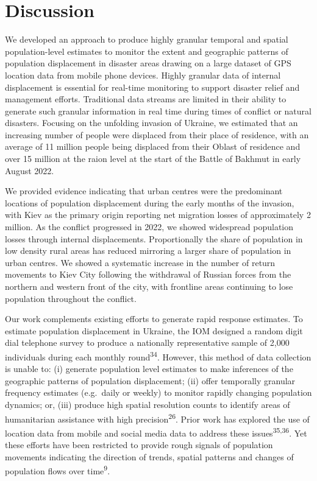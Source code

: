 \documentclass[
  11pt,
]{article}
\begin{document}
\section{Discussion}\label{discussion}

We developed an approach to produce highly granular temporal and spatial
population-level estimates to monitor the extent and geographic patterns
of population displacement in disaster areas drawing on a large dataset
of GPS location data from mobile phone devices. Highly granular data of
internal displacement is essential for real-time monitoring to support
disaster relief and management efforts. Traditional data streams are
limited in their ability to generate such granular information in real
time during times of conflict or natural disasters. Focusing on the
unfolding invasion of Ukraine, we estimated that an increasing number of
people were displaced from their place of residence, with an average of
11 million people being displaced from their Oblast of residence and
over 15 million at the raion level at the start of the Battle of Bakhmut
in early August 2022.

We provided evidence indicating that urban centres were the predominant
locations of population displacement during the early months of the
invasion, with Kiev as the primary origin reporting net migration losses
of approximately 2 million. As the conflict progressed in 2022, we
showed widespread population losses through internal displacements.
Proportionally the share of population in low density rural areas has
reduced mirroring a larger share of population in urban centres. We
showed a systematic increase in the number of return movements to Kiev
City following the withdrawal of Russian forces from the northern and
western front of the city, with frontline areas continuing to lose
population throughout the conflict.

Our work complements existing efforts to generate rapid response
estimates. To estimate population displacement in Ukraine, the IOM
designed a random digit dial telephone survey to produce a nationally
representative sample of 2,000 individuals during each monthly
round\textsuperscript{34}. However, this method of data collection is
unable to: (i) generate population level estimates to make inferences of
the geographic patterns of population displacement; (ii) offer
temporally granular frequency estimates (e.g.~daily or weekly) to
monitor rapidly changing population dynamics; or, (iii) produce high
spatial resolution counts to identify areas of humanitarian assistance
with high precision\textsuperscript{26}. Prior work has explored the use
of location data from mobile and social media data to address these
issues\textsuperscript{35,36}. Yet these efforts have been restricted to
provide rough signals of population movements indicating the direction
of trends, spatial patterns and changes of population flows over
time\textsuperscript{9}.
\end{document}
